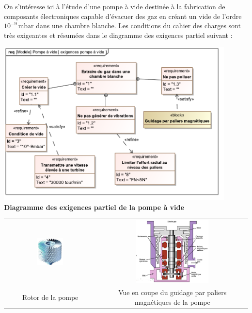\documentclass[10pt,fleqn]{article} %
\begin{document}
\begin{exemple}
On s'intéresse ici à l'étude d'une pompe à vide destinée à la fabrication de composants électroniques capable d'évacuer des gaz en créant un vide de l'ordre $10^{-9}\,\text{mbar}$ dans une chambre blanche. Les conditions du cahier des charges sont très exigeantes et résumées dans le diagramme des exigences partiel suivant : 

\begin{center}
\includegraphics[width=0.9\textwidth]{images/req_pompe.pdf}\\
\textbf{Diagramme des exigences partiel de la pompe à vide}
\end{center}
\end{exemple}

\begin{center}
\begin{tabular}{cc}
\includegraphics[width=0.3\textwidth]{images/rotor_pompe.jpg}
&
\includegraphics[width=0.5\textwidth]{images/guidage_pompe.jpg}
\\
Rotor de la pompe
&
Vue en coupe du guidage par paliers magnétiques de la pompe
\end{tabular}
\end{center}
\end{document}
